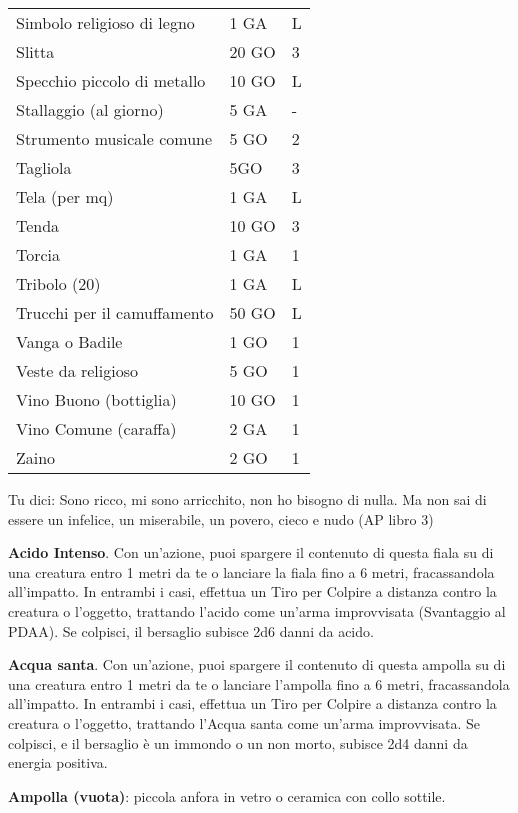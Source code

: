 \documentclass[12pt,a4paper,twoside,openany]{book}
\begin{document}
\begin{multicols}{2}
{\begin{tabularx}{0.42\textwidth}{lll}
Simbolo religioso di legno  & 1 GA& L\\
Slitta& 20 GO  & 3 \\
Specchio piccolo di metallo & 10 GO  & L\\
Stallaggio (al giorno)  & 5 GA& -\\
Strumento musicale comune& 5 GO& 2\\
Tagliola& 5GO&3\\
Tela (per mq)& 1 GA& L \\
Tenda & 10 GO  & 3 \\
Torcia& 1 GA& 1\\
Tribolo (20) & 1 GA& L \\
Trucchi per il camuffamento & 50 GO& L\\
Vanga o Badile & 1 GO&1\\
Veste da religioso & 5 GO& 1\\
Vino Buono (bottiglia) & 10 GO& 1\\
Vino Comune (caraffa)  & 2 GA& 1\\
Zaino & 2 GO& 1 \\
\end{tabularx}}


\begin{changemargin}{0.3cm}{0.3cm}\begin{enfasi}{
Tu dici: Sono ricco, mi sono arricchito, non ho bisogno di nulla. Ma non sai di essere un infelice, un miserabile, un povero, cieco e nudo (AP libro 3)
}\end{enfasi}\end{changemargin}

\textbf{Acido Intenso}. Con un’azione, puoi spargere il contenuto di questa fiala su di una creatura entro 1 metri da te o lanciare la fiala fino a 6 metri, fracassandola all’impatto. In entrambi i casi, effettua un Tiro per Colpire a distanza contro la creatura o l’oggetto, trattando l’acido come un’arma improvvisata (Svantaggio al PDAA). Se colpisci, il bersaglio subisce 2d6 danni da acido.

\textbf{Acqua santa}. Con un’azione, puoi spargere il contenuto di questa ampolla su di una creatura entro 1 metri da te o lanciare l’ampolla fino a 6 metri, fracassandola all’impatto. In entrambi i casi, effettua un Tiro per Colpire a distanza contro la creatura o l’oggetto, trattando l’Acqua santa come un’arma improvvisata. Se colpisci, e il bersaglio è un immondo o un non morto, subisce 2d4 danni da energia positiva.

\textbf{Ampolla (vuota)}: piccola anfora in vetro o ceramica con collo sottile.


\end{multicols}
\end{document}
